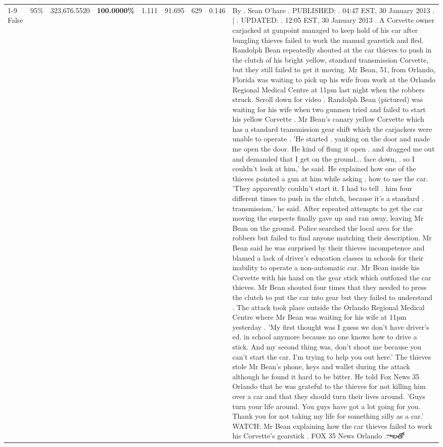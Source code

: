 \begin{table}[H]
\begin{tabular}{lllrlllll}
\cline{1-9} \cline{2-9}
False & 95\% & 323,676.5520 & \bfseries \color{red} 100.0000\% & 1.111 & 91.695 & 629 & 0.146 & By . Sean O'hare . PUBLISHED: . 04:47 EST, 30 January 2013 . | . UPDATED: . 12:05 EST, 30 January 2013 . A Corvette owner carjacked at gunpoint managed to keep hold of his car after bungling thieves failed to work the manual gearstick and fled. Randolph Bean repeatedly shouted at the car thieves to push in the clutch of his bright yellow, standard transmission Corvette, but they still failed to get it moving. Mr Bean, 51, from Orlando, Florida was waiting to pick up his wife from work at the Orlando Regional Medical Centre at 11pm last night when the robbers struck. Scroll down for video . Randolph Bean (pictured) was waiting for his wife when two gunmen tried and failed to start his yellow Corvette . Mr Bean's canary yellow Corvette which has a standard transmission gear shift which the carjackers were unable to operate . 'He started . yanking on the door and made me open the door. He kind of flung it open . and dragged me out and demanded that I get on the ground... face down, . so I couldn't look at him,' he said. He explained how one of the thieves pointed a gun at him while asking . how to use the car. 'They apparently couldn't start it. I had to tell . him four different times to push in the clutch, because it's a standard . transmission,' he said. After repeated attempts to get the car moving the suspects finally gave up and ran away, leaving Mr Bean on the ground. Police searched the local area for the robbers but failed to find anyone matching their description. Mr Bean said he was surprised by their thieves incompetence and blamed a lack of driver's education classes in schools for their inability to operate a non-automatic car. Mr Bean inside his Corvette with his hand on the gear stick which outfoxed the car thieves. Mr Bean shouted four times that they needed to press the clutch to put the car into gear but they failed to understand . The attack took place outside the Orlando Regional Medical Centre where Mr Bean was waiting for his wife at 11pm yesterday . 'My first thought was I guess we don't have driver's ed. in school anymore because no one knows how to drive a stick. And my second thing was, don't shoot me because you can't start the car. I'm trying to help you out here.' The thieves stole Mr Bean's phone, keys and wallet during the attack although he found it hard to be bitter. He told Fox News 35 Orlando that he was grateful to the thieves for not killing him over a car and that they should turn their lives around. 'Guys turn your life around. You guys have got a lot going for you. Thank you for not taking my life for something silly as a car.' WATCH: Mr Bean explaining how the car thieves failed to work his Corvette's gearstick . FOX 35 News Orlando .ాలతో \\

\end{tabular}
\end{table}
